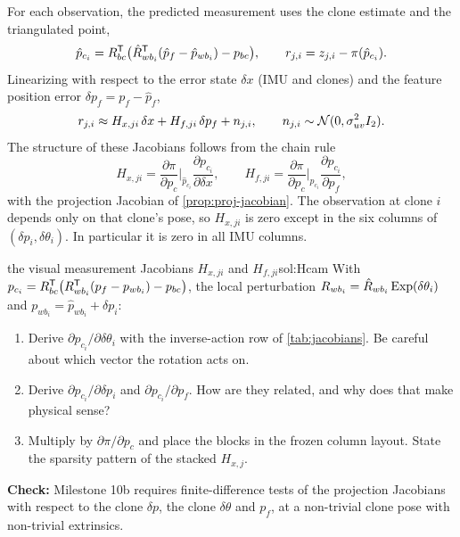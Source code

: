 For each observation, the predicted measurement uses the clone estimate and the triangulated point,
\begin{equation}
  \hat p_{c_i} = R_{bc}^{\mathsf{T}}\big(\hat R_{wb_i}^{\mathsf{T}}(\hat p_f - \hat p_{wb_i}) - p_{bc}\big), \qquad
  r_{j,i} = z_{j,i} - \pi(\hat p_{c_i}) .
\end{equation}
Linearizing with respect to the error state $\delta x$ (IMU and clones) and the feature position error $\delta p_f = p_f - \hat p_f$,
\begin{equation}
  r_{j,i} \approx H_{x,ji}\,\delta x + H_{f,ji}\,\delta p_f + n_{j,i}, \qquad n_{j,i} \sim \mathcal{N}(0, \sigma_{uv}^2I_2).
\end{equation}
The structure of these Jacobians follows from the chain rule
\begin{equation}
  H_{x,ji} = \frac{\partial\pi}{\partial p_c}\Big|_{\hat p_{c_i}}\frac{\partial p_{c_i}}{\partial\delta x},\qquad
  H_{f,ji} = \frac{\partial\pi}{\partial p_c}\Big|_{\hat p_{c_i}}\frac{\partial p_{c_i}}{\partial p_f},
\end{equation}
with the projection Jacobian of \cref{prop:proj-jacobian}. The observation at clone $i$ depends only on that clone's pose, so
$H_{x,ji}$ is zero except in the six columns of $(\delta p_i, \delta\theta_i)$. In particular it is zero in all IMU columns.

\begin{derivex}{the visual measurement Jacobians $H_{x,ji}$ and $H_{f,ji}$}{sol:Hcam}
With $p_{c_i} = R_{bc}^{\mathsf{T}}\big(R_{wb_i}^{\mathsf{T}}(p_f - p_{wb_i}) - p_{bc}\big)$, the local perturbation $R_{wb_i} = \hat R_{wb_i}\operatorname{Exp}(\delta\theta_i)$ and
$p_{wb_i} = \hat p_{wb_i} + \delta p_i$:
\begin{enumerate}
  \item Derive $\partial p_{c_i}/\partial\delta\theta_i$ with the inverse-action row of \cref{tab:jacobians}. Be careful about which
        vector the rotation acts on.
  \item Derive $\partial p_{c_i}/\partial\delta p_i$ and $\partial p_{c_i}/\partial p_f$. How are they related, and why does that make physical sense?
  \item Multiply by $\partial\pi/\partial p_c$ and place the blocks in the frozen column layout. State the sparsity pattern of the stacked
        $H_{x,j}$.
\end{enumerate}
\textbf{Check:} Milestone 10b requires finite-difference tests of the projection Jacobians with respect to the clone
$\delta p$, the clone $\delta\theta$ and $p_f$, at a non-trivial clone pose with non-trivial extrinsics.
\end{derivex}

